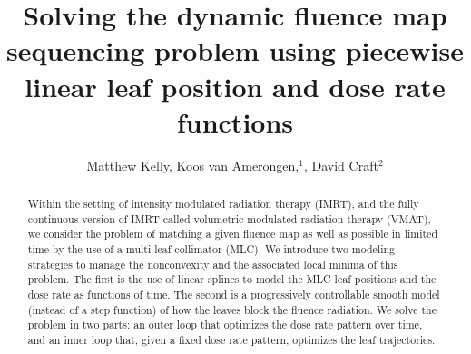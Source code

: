 \documentclass{iopart}
\begin{document}
\title[Dynamic MLC sequencing with splines ]{Solving the dynamic fluence map sequencing problem using piecewise linear leaf position and dose rate functions}
\author{Matthew Kelly, Koos van Amerongen,$^1$, David Craft$^2$}
\address{$^1$ Department of Econometrics and Operations Research/Center for Economic Research (CentER), Tilburg University, PO Box 90153, 5
000 LE Tilburg, The Netherlands}
\address{$^2$ Department of Radiation Oncology, Massachusetts General Hospital and Harvard Medical School, Boston, MA 02114, USA}

\begin{abstract}
  Within the setting of intensity modulated radiation therapy (IMRT), and the fully continuous version of IMRT called volumetric modulated radiation therapy (VMAT), we consider the problem of matching a given fluence map as well as possible in limited time by the use of a multi-leaf collimator (MLC). We introduce two modeling strategies to manage the nonconvexity and the associated local minima of this problem. The first is the use of linear splines to model the MLC leaf positions and the dose rate as functions of time. The second is a progressively controllable smooth model (instead of a step function) of how the leaves block the fluence radiation. We solve the problem in two parts: an outer loop that optimizes the dose rate pattern over time, and an inner loop that, given a fixed dose rate pattern, optimizes the leaf trajectories.
\end{abstract}
\end{document}
